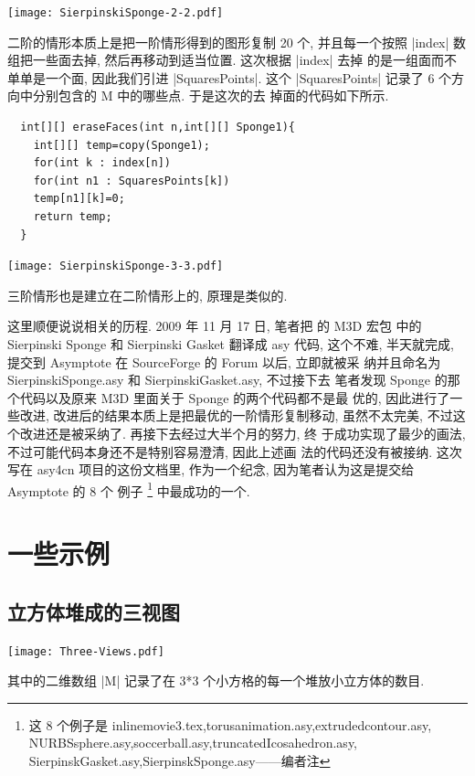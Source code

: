 \documentclass[nofonts,CJKnormalspaces]{ctexbook}[2009/05/20]
\newcommand\transnote[1]{\footnote{#1——编者注}}
\begin{document}

\begin{center}
  \texttt{[image: SierpinskiSponge-2-2.pdf]}
\end{center}
二阶的情形本质上是把一阶情形得到的图形复制 20 个, 并且每一个按照
|index| 数组把一些面去掉, 然后再移动到适当位置. 这次根据 |index| 去掉
的是一组面而不单单是一个面, 因此我们引进 |SquaresPoints|. 这个
|SquaresPoints| 记录了 6 个方向中分别包含的 M 中的哪些点. 于是这次的去
掉面的代码如下所示.
\begin{lstlisting}
  int[][] eraseFaces(int n,int[][] Sponge1){
    int[][] temp=copy(Sponge1);
    for(int k : index[n])
    for(int n1 : SquaresPoints[k])
    temp[n1][k]=0;
    return temp;
  }
\end{lstlisting}


\begin{center}
  \texttt{[image: SierpinskiSponge-3-3.pdf]}
\end{center}
三阶情形也是建立在二阶情形上的, 原理是类似的.

这里顺便说说相关的历程. 2009 年 11 月 17 日, 笔者把 \MP{} 的 M3D 宏包
中的 Sierpinski Sponge 和 Sierpinski Gasket 翻译成 asy 代码, 这个不难,
半天就完成, 提交到 Asymptote 在 SourceForge 的 Forum 以后, 立即就被采
纳并且命名为 SierpinskiSponge.asy 和 SierpinskiGasket.asy, 不过接下去
笔者发现 Sponge 的那个代码以及原来 M3D 里面关于 Sponge 的两个代码都不是最
优的, 因此进行了一些改进, 改进后的结果本质上是把最优的一阶情形复制移动,
虽然不太完美, 不过这个改进还是被采纳了. 再接下去经过大半个月的努力, 终
于成功实现了最少的画法, 不过可能代码本身还不是特别容易澄清, 因此上述画
法的代码还没有被接纳. 这次写在 asy4cn 项目的这份文档里, 作为一个纪念,
因为笔者认为这是提交给 Asymptote 的 8 个 例子
\transnote{这 8 个例子是
  inlinemovie3.tex,torusanimation.asy,extrudedcontour.asy,
  NURBSsphere.asy,soccerball.asy,truncatedIcosahedron.asy,
  SierpinskGasket.asy,SierpinskSponge.asy}
中最成功的一个.

\section{一些示例}

\subsection{立方体堆成的三视图}
\begin{center}\texttt{[image: Three-Views.pdf]}\end{center}%

其中的二维数组 |M| 记录了在 3*3 个小方格的每一个堆放小立方体的数目.
\end{document}
